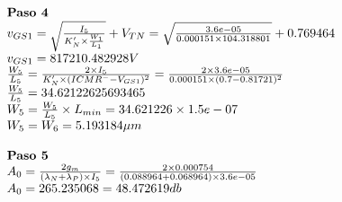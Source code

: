 \begin{equation}
	\begin{array}{l l}
		\textbf{Paso 4} \\
		v_{GS1} = \sqrt{\frac{I_{5}}{K'_{N}\times\frac{W_{1}}{L_{1}}}}+V_{TN} = \sqrt{\frac{ 3.6e-05 }{ 0.000151 \times 104.318801 }}+ 0.769464  \\
		v_{GS1} =  817210.482928  V \\
		\frac{W_{5}}{L_{5}} = \frac{2\times I_{5}}{K'_{N}\times (ICMR^{-}-V_{{GS1}})^{2}} = \frac{2\times 3.6e-05 }{ 0.000151 \times ( 0.7 - 0.81721 )^{2}} \\
		\frac{W_5}{L_5} =  34.62122625693465  \\
		W_{5} = \frac{W_5}{L_5} \times L_{min} =  34.621226 \times 1.5e-07  \\
		W_{5} = W_{6} =  5.193184  \mu m \\
		\\
		\textbf{Paso 5} \\
		A_{0} = \frac{2g_{m}}{(\lambda_{N}+\lambda_{P})\times I_{5}} = \frac{2\times 0.000754 }{( 0.088964 + 0.068964 )\times 3.6e-05 } \\
		A_{0} =  265.235068  =  48.472619  db \\
	\end{array}
\end{equation}

